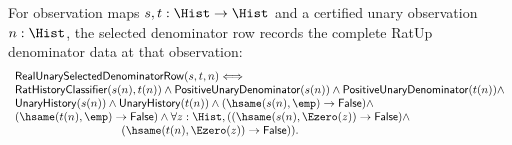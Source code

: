 \begin{definition}
\label{def:real-unary-selected-denominator-row}
For observation maps $s,t:\Hist\to\Hist$ and a certified unary observation
$n:\Hist$, the selected denominator row records the complete RatUp denominator
data at that observation:
$$
\begin{array}{l}
\mathsf{RealUnarySelectedDenominatorRow}(s,t,n)
\Longleftrightarrow\\
\mathsf{RatHistoryClassifier}(s(n),t(n))\land
\mathsf{PositiveUnaryDenominator}(s(n))\land
\mathsf{PositiveUnaryDenominator}(t(n))\land\\
\mathsf{UnaryHistory}(s(n))\land
\mathsf{UnaryHistory}(t(n))\land
(\hsame(s(n),\emp)\to\mathsf{False})\land\\
(\hsame(t(n),\emp)\to\mathsf{False})\land
\forall z:\Hist,
((\hsame(s(n),\Ezero(z))\to\mathsf{False})\land\\
\hspace{3.3cm}(\hsame(t(n),\Ezero(z))\to\mathsf{False})).
\end{array}
$$
\end{definition}

